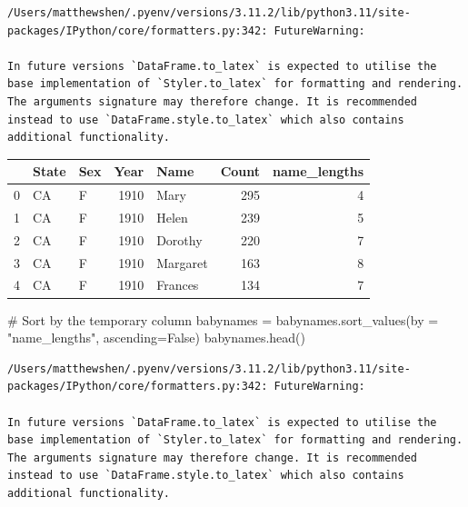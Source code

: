 \documentclass[
  letterpaper,
  DIV=11,
  numbers=noendperiod]{scrreprt}
\newenvironment{Shaded}{\begin{snugshade}}{\end{snugshade}}
\newcommand{\CommentTok}[1]{\textcolor[rgb]{0.37,0.37,0.37}{#1}}
\newcommand{\NormalTok}[1]{\textcolor[rgb]{0.00,0.23,0.31}{#1}}
\newcommand{\OperatorTok}[1]{\textcolor[rgb]{0.37,0.37,0.37}{#1}}
\newcommand{\StringTok}[1]{\textcolor[rgb]{0.13,0.47,0.30}{#1}}
\newcommand{\VariableTok}[1]{\textcolor[rgb]{0.07,0.07,0.07}{#1}}
\begin{document}
\begin{verbatim}
/Users/matthewshen/.pyenv/versions/3.11.2/lib/python3.11/site-packages/IPython/core/formatters.py:342: FutureWarning:

In future versions `DataFrame.to_latex` is expected to utilise the base implementation of `Styler.to_latex` for formatting and rendering. The arguments signature may therefore change. It is recommended instead to use `DataFrame.style.to_latex` which also contains additional functionality.
\end{verbatim}

\begin{tabular}{lllrlrr}
\toprule
{} & State & Sex &  Year &      Name &  Count &  name\_lengths \\
\midrule
0 &    CA &   F &  1910 &      Mary &    295 &             4 \\
1 &    CA &   F &  1910 &     Helen &    239 &             5 \\
2 &    CA &   F &  1910 &   Dorothy &    220 &             7 \\
3 &    CA &   F &  1910 &  Margaret &    163 &             8 \\
4 &    CA &   F &  1910 &   Frances &    134 &             7 \\
\bottomrule
\end{tabular}

\begin{Shaded}
\begin{Highlighting}[]
\CommentTok{\# Sort by the temporary column}
\NormalTok{babynames }\OperatorTok{=}\NormalTok{ babynames.sort\_values(by }\OperatorTok{=} \StringTok{"name\_lengths"}\NormalTok{, ascending}\OperatorTok{=}\VariableTok{False}\NormalTok{)}
\NormalTok{babynames.head()}
\end{Highlighting}
\end{Shaded}

\begin{verbatim}
/Users/matthewshen/.pyenv/versions/3.11.2/lib/python3.11/site-packages/IPython/core/formatters.py:342: FutureWarning:

In future versions `DataFrame.to_latex` is expected to utilise the base implementation of `Styler.to_latex` for formatting and rendering. The arguments signature may therefore change. It is recommended instead to use `DataFrame.style.to_latex` which also contains additional functionality.
\end{verbatim}
\end{document}
